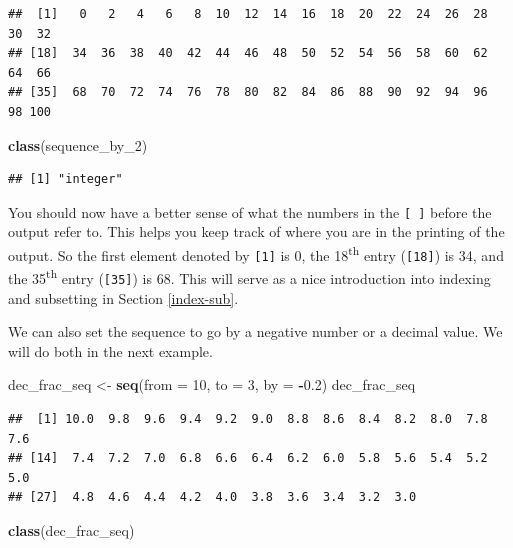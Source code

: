 \documentclass[]{tufte-book}
\newenvironment{Shaded}{\begin{snugshade}}{\end{snugshade}}
\newcommand{\AttributeTok}[1]{\textcolor[rgb]{0.13,0.29,0.53}{#1}}
\newcommand{\DecValTok}[1]{\textcolor[rgb]{0.00,0.00,0.81}{#1}}
\newcommand{\FloatTok}[1]{\textcolor[rgb]{0.00,0.00,0.81}{#1}}
\newcommand{\FunctionTok}[1]{\textcolor[rgb]{0.13,0.29,0.53}{\textbf{#1}}}
\newcommand{\NormalTok}[1]{#1}
\newcommand{\OtherTok}[1]{\textcolor[rgb]{0.56,0.35,0.01}{#1}}
\newcommand{\SpecialCharTok}[1]{\textcolor[rgb]{0.81,0.36,0.00}{\textbf{#1}}}
\begin{document}
\begin{verbatim}
##  [1]   0   2   4   6   8  10  12  14  16  18  20  22  24  26  28  30  32
## [18]  34  36  38  40  42  44  46  48  50  52  54  56  58  60  62  64  66
## [35]  68  70  72  74  76  78  80  82  84  86  88  90  92  94  96  98 100
\end{verbatim}

\begin{Shaded}
\begin{Highlighting}[]
\FunctionTok{class}\NormalTok{(sequence\_by\_2)}
\end{Highlighting}
\end{Shaded}

\begin{verbatim}
## [1] "integer"
\end{verbatim}

You should now have a better sense of what the numbers in the \texttt{{[}\ {]}} before the output refer to. This helps you keep track of where you are in the printing of the output. So the first element denoted by \texttt{{[}1{]}} is 0, the 18\textsuperscript{th} entry (\texttt{{[}18{]}}) is 34, and the 35\textsuperscript{th} entry (\texttt{{[}35{]}}) is 68. This will serve as a nice introduction into indexing and subsetting in Section \ref{index-sub}.

We can also set the sequence to go by a negative number or a decimal value. We will do both in the next example.

\begin{Shaded}
\begin{Highlighting}[]
\NormalTok{dec\_frac\_seq }\OtherTok{\textless{}{-}} \FunctionTok{seq}\NormalTok{(}\AttributeTok{from =} \DecValTok{10}\NormalTok{, }\AttributeTok{to =} \DecValTok{3}\NormalTok{, }\AttributeTok{by =} \SpecialCharTok{{-}}\FloatTok{0.2}\NormalTok{)}
\NormalTok{dec\_frac\_seq}
\end{Highlighting}
\end{Shaded}

\begin{verbatim}
##  [1] 10.0  9.8  9.6  9.4  9.2  9.0  8.8  8.6  8.4  8.2  8.0  7.8  7.6
## [14]  7.4  7.2  7.0  6.8  6.6  6.4  6.2  6.0  5.8  5.6  5.4  5.2  5.0
## [27]  4.8  4.6  4.4  4.2  4.0  3.8  3.6  3.4  3.2  3.0
\end{verbatim}

\begin{Shaded}
\begin{Highlighting}[]
\FunctionTok{class}\NormalTok{(dec\_frac\_seq)}
\end{Highlighting}
\end{Shaded}
\end{document}
